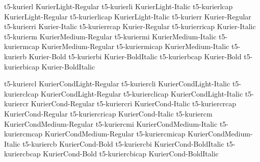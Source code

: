 \documentclass[test]{vnsample}
\begin{document}
\begin{shortsample}
      {t5-kurierl}      {KurierLight-Regular}
     {t5-kurierli}     {KurierLight-Italic}
     {t5-kurierlcap}   {KurierLight-Regular}
   {t5-kurierlicap}  {KurierLight-Italic}
      {t5-kurierr}      {Kurier-Regular}
     {t5-kurierri}     {Kurier-Italic}
     {t5-kurierrcap}   {Kurier-Regular}
   {t5-kurierricap}  {Kurier-Italic}
     {t5-kurierm}      {KurierMedium-Regular}
    {t5-kuriermi}     {KurierMedium-Italic}
    {t5-kuriermcap}   {KurierMedium-Regular}
  {t5-kuriermicap}  {KurierMedium-Italic}
      {t5-kurierb}      {Kurier-Bold}
     {t5-kurierbi}     {Kurier-BoldItalic}
     {t5-kurierbcap}   {Kurier-Bold}
   {t5-kurierbicap}  {Kurier-BoldItalic}
\end{shortsample}
\clearpage
\begin{shortsample}
     {t5-kuriercl}     {KurierCondLight-Regular}
    {t5-kuriercli}    {KurierCondLight-Italic}
    {t5-kurierclcap}  {KurierCondLight-Regular}
  {t5-kurierclicap} {KurierCondLight-Italic}
     {t5-kuriercr}     {KurierCond-Regular}
    {t5-kuriercri}    {KurierCond-Italic}
    {t5-kuriercrcap}  {KurierCond-Regular}
  {t5-kuriercricap} {KurierCond-Italic}
    {t5-kuriercm}     {KurierCondMedium-Regular}
   {t5-kuriercmi}    {KurierCondMedium-Italic}
   {t5-kuriercmcap}  {KurierCondMedium-Regular}
 {t5-kuriercmicap} {KurierCondMedium-Italic}
     {t5-kuriercb}     {KurierCond-Bold}
    {t5-kuriercbi}    {KurierCond-BoldItalic}
    {t5-kuriercbcap}  {KurierCond-Bold}
  {t5-kuriercbicap} {KurierCond-BoldItalic}
\end{shortsample}
\end{document}
